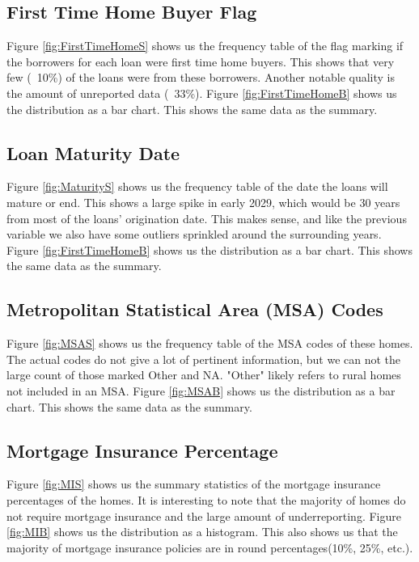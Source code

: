 \documentclass[10pt,twocolumn,letterpaper]{article}
\begin{document}
\subsection{First Time Home Buyer Flag}

Figure \ref{fig:FirstTimeHomeS} shows us the frequency table of the flag marking if the borrowers for each loan were first time home buyers. This shows that very few (~10\%) of the loans were from these borrowers. Another notable quality is the amount of unreported data (~33\%). Figure \ref{fig:FirstTimeHomeB} shows us the distribution as a bar chart. This shows the same data as the summary. 

\subsection{Loan Maturity Date}

Figure \ref{fig:MaturityS} shows us the frequency table of the date the loans will mature or end. This shows a large spike in early 2029, which would be 30 years from most of the loans' origination date. This makes sense, and like the previous variable we also have some outliers sprinkled around the surrounding years. Figure \ref{fig:FirstTimeHomeB} shows us the distribution as a bar chart. This shows the same data as the summary. 

\subsection{Metropolitan Statistical Area (MSA) Codes}

Figure \ref{fig:MSAS} shows us the frequency table of the MSA codes of these homes. The actual codes do not give a lot of pertinent information, but we can not the large count of those marked Other and NA. "Other" likely refers to rural homes not included in an MSA. Figure \ref{fig:MSAB} shows us the distribution as a bar chart. This shows the same data as the summary. 

\subsection{Mortgage Insurance Percentage}

Figure \ref{fig:MIS} shows us the summary statistics of the mortgage insurance percentages of the homes. It is interesting to note that the majority of homes do not require mortgage insurance and the large amount of underreporting. Figure \ref{fig:MIB} shows us the distribution as a histogram. This also shows us that the majority of mortgage insurance policies are in round percentages(10\%, 25\%, etc.).
\end{document}
